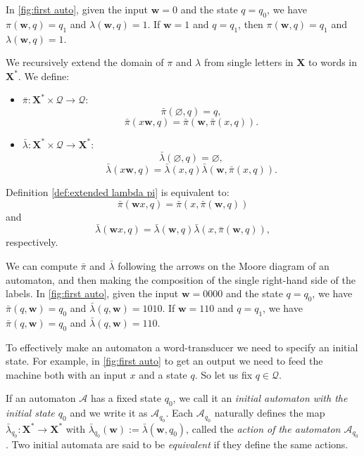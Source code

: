 \documentclass[mat1]{fmfdeloTS2.0}
\newcommand{\obs}{}				%
\newcommand{\word}{\mathbf}				%
\newcommand{\abece}{\mathbf{X}}			%
\newcommand{\fslovar}{\mathbf{X^*}}		%
\newcommand{\auto}{\mathcal}			%
\newcommand{\QQ}{\mathcal{Q}}			%
\newcommand{\PI}{\bar{\pi}}			%
\newcommand{\LAMBDA}{\bar{\lambda}}			%
\begin{document}
\begin{example}
In \autoref{fig:first auto}, given the input $\word{w}=0$ and the state $q=q_0$, we have $\pi(\word{w},q)=q_1$ and $\lambda(\word{w},q)=1$. If $\word{w}=1$ and $q=q_1$, then $\pi(\word{w},q)=q_1$ and $\lambda(\word{w},q)=1$.
\end{example}

\begin{definition}
We recursively extend the domain of $\pi$ and $\lambda$ from single letters in $\abece$ to \obs{words} in $\fslovar$. We define:
\begin{itemize}
	\item $\PI:\fslovar \times \QQ\longrightarrow \QQ :$ 
	$$\PI(\varnothing,q)=q,$$ $$\PI(x \word{w},q)=\PI(\word{w},\PI(x,q)).$$
	\item $\LAMBDA:\fslovar \times \QQ\longrightarrow \fslovar :$
	$$\LAMBDA(\varnothing,q)=\varnothing,$$ $$\LAMBDA(x \word{w},q)=\LAMBDA(x,q)\LAMBDA(\word{w},\PI(x,q)).$$
\end{itemize}
\label{def:extended lambda pi}
\end{definition}

\begin{remark}
Definition \autoref{def:extended lambda pi} is equivalent to:
$$\PI(\word{w} x,q)=\PI(x,\PI(\word{w},q))$$ and
$$\LAMBDA(\word{w} x,q)=\LAMBDA(\word{w},q) \LAMBDA(x,\PI(\word{w},q)),$$ respectively.
\end{remark}

\begin{example}
We can compute $\PI$ and $\LAMBDA$ following the arrows on the Moore diagram of an automaton, and then making the composition of the single right-hand side of the labels. In \autoref{fig:first auto}, given the input $\word{w}=0000$ and the state $q=q_0$, we have $\PI(q,\word{w})=q_0$ and $\LAMBDA(q,\word{w})=1010$. If $\word{w}=110$ and $q=q_1$, we have $\PI(q,\word{w})=q_0$ and $\LAMBDA(q,\word{w})=110$.
\end{example}

To effectively make an automaton a word-transducer we need to specify an initial state. For example, in \autoref{fig:first auto} to get an output we need to feed the machine both with an input $x$ and a state $q$. So let us fix $q\in\QQ$.

\begin{definition}
If an  automaton $\auto{A}$ has a fixed state $q_0$, we call it an \emph{initial automaton with the initial state $q_0$} and we write it as $\auto{A}_{q_0}$. Each $\auto{A}_{q_0}$ naturally defines the map $\LAMBDA_{q_0}:\fslovar\longrightarrow\fslovar$ with $\LAMBDA_{q_0}(\word{w}):=\LAMBDA(\word{w},q_0)$, called the \emph{action of the automaton $\auto{A}_{q_0}$}. Two \obs{initial automata} are said to be \emph{equivalent} if they define the same actions.
\end{definition}
\end{document}

